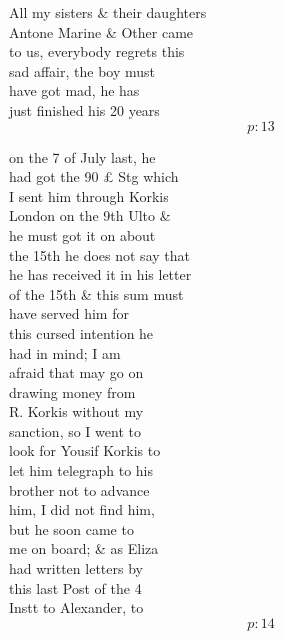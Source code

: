 \documentclass{report}
\begin{document}
	\par{
 	All my sisters \& their daughters\ \\Antone Marine \& Other came\ \\to us, everybody regrets this\ \\sad affair, the boy must\ \\have got mad, he has\ \\just finished his 20 years\ \\
  \[p: 13 \]

	}


	\par{
 	on the 7 of July last, he\ \\had got the 90 £ Stg which\ \\I sent him through Korkis\ \\London on the 9th Ulto \&\ \\he must got it on about\ \\the 15th he does not say that\ \\he has received it in his letter\ \\of the 15th \& this sum must\ \\have served him for\ \\this cursed intention he\ \\had in mind; I am\ \\afraid that may go on\ \\drawing money from\ \\R. Korkis without my\ \\sanction, so I went to\ \\look for Yousif Korkis to\ \\let him telegraph to his\ \\brother not to advance\ \\him, I did not find him,\ \\but he soon came to\ \\me on board; \& as Eliza\ \\had written letters by\ \\this last Post of the 4\ \\Instt to Alexander, to\ \\
  \[p: 14 \]

	}
\end{document}
